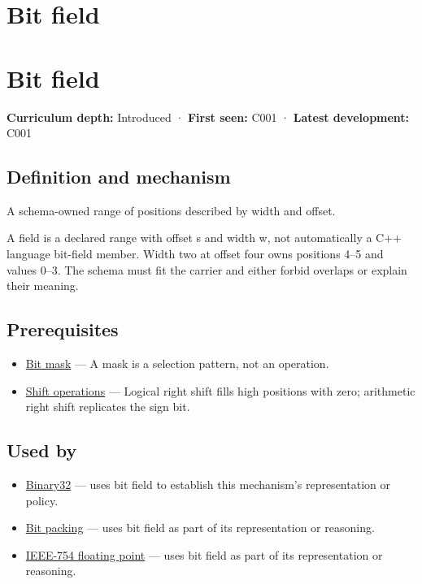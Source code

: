 \hypertarget{appendix-ac697f5c66e8}{}
\section*{Bit field}
\section{Bit field}\label{appendix-ac697f5c66e8-bit-field}

\textbf{Curriculum depth:} Introduced · \textbf{First seen:} C001 · \textbf{Latest development:} C001

\subsection{Definition and mechanism}\label{appendix-ac697f5c66e8-definition-and-mechanism}

A schema-owned range of positions described by width and offset.

A field is a declared range with offset s and width w, not automatically a C++ language bit-field member. Width two at offset four owns positions 4--5 and values 0--3. The schema must fit the carrier and either forbid overlaps or explain their meaning.

\subsection{Prerequisites}\label{appendix-ac697f5c66e8-prerequisites}

\begin{itemize}
\tightlist
\item
  \hyperref[appendix-dbe5905163c2]{Bit mask} --- A mask is a selection pattern, not an operation.
\item
  \hyperref[appendix-73425b25118e]{Shift operations} --- Logical right shift fills high positions with zero; arithmetic right shift replicates the sign bit.
\end{itemize}

\subsection{Used by}\label{appendix-ac697f5c66e8-used-by}

\begin{itemize}
\item
  \hyperref[appendix-5057f9ad327f]{Binary32} --- uses bit field to establish this mechanism's representation or policy.
\item
  \hyperref[appendix-1f9963e1a5d1]{Bit packing} --- uses bit field as part of its representation or reasoning.
\item
  \hyperref[appendix-343615f49ddf]{IEEE-754 floating point} --- uses bit field as part of its representation or reasoning.
\end{itemize}

